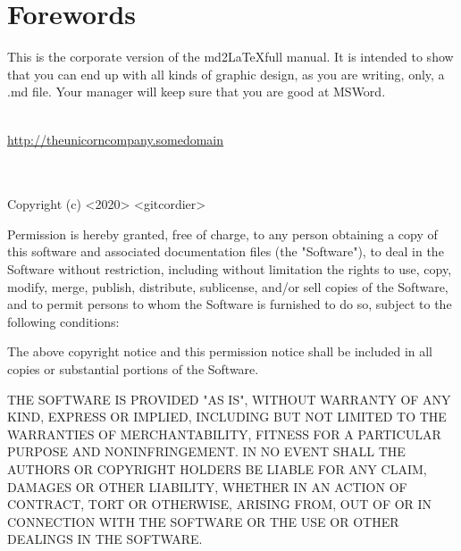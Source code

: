 \documentclass[a4paper, 11pt, titlepage, openany]{article}
\author{Git Cordier \\\texttt{admin@gcordier.eu}}\setlength\parindent{0pt}
\begin{document}



\section*{Forewords}
This is the corporate version of the md2\LaTeX full manual.
It is intended to show that you can end up with all kinds of graphic design, 
as you are writing, only, a .md file. 
Your manager will keep sure that you are good at MSWord.


\vspace{7cm}
{\color{corporate_blue}{THE UNICORN COMPANY}}\\
\href{https://github.com/gitcordier}{\underline{http://theunicorncompany.somedomain}}\\
\href{mailto:admin@gcordier.eu}{}\\
\\
{\fw Copyright (c) <2020> <gitcordier>

Permission is hereby granted, free of charge, to any person obtaining a copy
of this software and associated documentation files (the "Software"), to deal
in the Software without restriction, including without limitation the rights
to use, copy, modify, merge, publish, distribute, sublicense, and/or sell
copies of the Software, and to permit persons to whom the Software is
furnished to do so, subject to the following conditions:

The above copyright notice and this permission notice shall be included in all
copies or substantial portions of the Software.

THE SOFTWARE IS PROVIDED "AS IS", WITHOUT WARRANTY OF ANY KIND, EXPRESS OR
IMPLIED, INCLUDING BUT NOT LIMITED TO THE WARRANTIES OF MERCHANTABILITY,
FITNESS FOR A PARTICULAR PURPOSE AND NONINFRINGEMENT. IN NO EVENT SHALL THE
AUTHORS OR COPYRIGHT HOLDERS BE LIABLE FOR ANY CLAIM, DAMAGES OR OTHER
LIABILITY, WHETHER IN AN ACTION OF CONTRACT, TORT OR OTHERWISE, ARISING FROM,
OUT OF OR IN CONNECTION WITH THE SOFTWARE OR THE USE OR OTHER DEALINGS IN THE
SOFTWARE.}
\newpage


\tableofcontents\newpage





\newcommand{\var}[1]{\${#1}}
\end{document}
